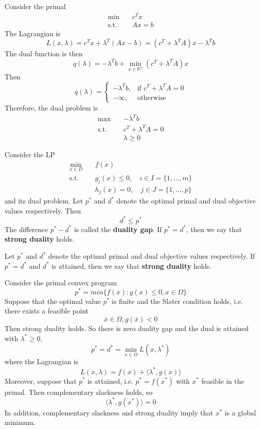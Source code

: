 \begin{example}
    Consider the primal 
    \begin{align*}
        \min \quad &c^Tx \\
        \text{s.t.} \quad &Ax = b
    \end{align*}
    The Lagrangian is $$L(x, \lambda) = c^Tx + \lambda^T(Ax - b) = (c^T + \lambda^TA)x - \lambda^Tb$$
    The dual function is then $$q(\lambda) =  -\lambda^Tb + \min_{x \in \mathbb R^n} (c^T + \lambda^TA)x$$
    Then $$q(\lambda) = \begin{cases}
        -\lambda^Tb, &\text{if } c^T + \lambda^TA = 0 \\
        -\infty, &\text{otherwise}
    \end{cases}$$ Therefore, the dual problem is 
    \begin{align*}
        \max \quad &-\lambda^Tb \\
        \text{s.t.} \quad &c^T + \lambda^TA = 0 \\
        &\lambda \geq 0
    \end{align*}
\end{example}
\begin{theorem}
    Consider the LP
    \begin{align*}
        \min_{x \in D} \quad &f(x) \\
        \mathrm{s.t.} \quad &g_i(x) \leq 0, \quad i \in I = \{1,\ldots,m\} \\
        &h_j(x) = 0, \quad j \in J = \{1,\ldots,p\}
    \end{align*}
    and its dual problem. Let $p^*$ and $d^*$ denote the optimal primal and dual objective values respectively. Then $$d^* \leq p^*$$
    The difference $p^* - d^*$ is called the \textbf{duality gap}. If $p^* = d^*$, then we say that \textbf{strong duality} holds.
\end{theorem}
\begin{definition}
    Let $p^*$ and $d^*$ denote the optimal primal and dual objective values respectively. If $p^* = d^*$ and $d^*$ is attained, then we say that \textbf{strong duality} holds.
\end{definition}
\begin{theorem}
    Consider the primal convex program $$p^* = min\{f(x): g(x) \leq 0, x \in \Omega\}$$ Suppose that the optimal value $p^*$ is finite and the Slater condition holds, i.e. there exists a feasible point $$\bar x \in \Omega, g(\bar x) < 0$$ Then strong duality holds. So there is zero duality gap and the dual is attained with $\lambda^* \geq 0$, $$p^* = d^* = \min_{x \in \Omega} L(x, \lambda^*)$$
    where the Lagrangian is $$L(x, \lambda) = f(x) + \langle \lambda^*, g(x) \rangle$$ Moreover, suppose that $p^*$ is attained, i.e. $p^* = f(x^*)$ with $x^*$ feasible in the primal. Then complementary slackness holds, so $$\langle \lambda^*, g(x^*) \rangle = 0$$ In addition, complementary slackness and strong duality imply that $x^*$ is a global minimum.
\end{theorem}
